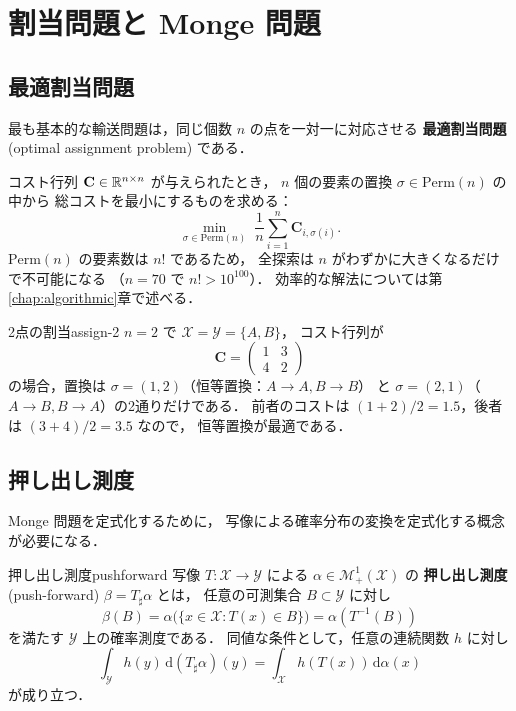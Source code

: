 \section{割当問題と Monge 問題}\label{sec:monge}

\subsection{最適割当問題}\label{subsec:assignment}

最も基本的な輸送問題は，同じ個数 $n$ の点を一対一に対応させる
\textbf{最適割当問題} (optimal assignment problem) である．

コスト行列 $\mathbf{C} \in \mathbb{R}^{n \times n}$ が与えられたとき，
$n$ 個の要素の置換 $\sigma \in \mathrm{Perm}(n)$ の中から
総コストを最小にするものを求める：
\begin{equation}\label{eq:assignment}
  \min_{\sigma \in \mathrm{Perm}(n)} \;
  \frac{1}{n} \sum_{i=1}^{n} \mathbf{C}_{i,\sigma(i)}.
\end{equation}
$\mathrm{Perm}(n)$ の要素数は $n!$ であるため，
全探索は $n$ がわずかに大きくなるだけで不可能になる
（$n = 70$ で $n! > 10^{100}$）．
効率的な解法については第\ref{chap:algorithmic}章で述べる．

\begin{example}{2点の割当}{assign-2}
$n=2$ で $\mathcal{X} = \mathcal{Y} = \{A, B\}$，
コスト行列が
\[
  \mathbf{C} = \begin{pmatrix} 1 & 3 \\ 4 & 2 \end{pmatrix}
\]
の場合，置換は $\sigma = (1,2)$（恒等置換：$A \to A, B \to B$）
と $\sigma = (2,1)$（$A \to B, B \to A$）の2通りだけである．
前者のコストは $(1+2)/2 = 1.5$，後者は $(3+4)/2 = 3.5$ なので，
恒等置換が最適である．
\end{example}

\subsection{押し出し測度}\label{subsec:pushforward}

Monge 問題を定式化するために，
写像による確率分布の変換を定式化する概念が必要になる．

\begin{definition}{押し出し測度}{pushforward}
写像 $T : \mathcal{X} \to \mathcal{Y}$ による
$\alpha \in \mathcal{M}^1_+(\mathcal{X})$ の
\textbf{押し出し測度} (push-forward) $\beta = T_\sharp \alpha$ とは，
任意の可測集合 $B \subset \mathcal{Y}$ に対し
\begin{equation}\label{eq:pushforward}
  \beta(B) = \alpha\bigl(\{x \in \mathcal{X} : T(x) \in B\}\bigr)
           = \alpha(T^{-1}(B))
\end{equation}
を満たす $\mathcal{Y}$ 上の確率測度である．
同値な条件として，任意の連続関数 $h$ に対し
\[
  \int_{\mathcal{Y}} h(y)\, \mathrm{d}(T_\sharp \alpha)(y)
  = \int_{\mathcal{X}} h(T(x))\, \mathrm{d}\alpha(x)
\]
が成り立つ．
\end{definition}

